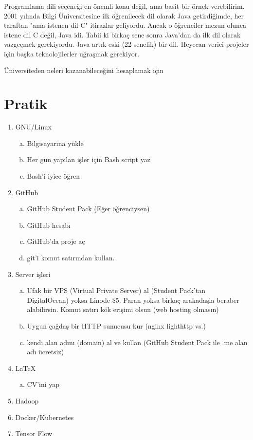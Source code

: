 \documentclass[a4paper,10pt]{article}
\begin{document}
Programlama dili seçeneği en önemli konu değil, ama basit bir örnek verebilirim. 2001 yılında Bilgi Üniversitesine ilk öğrenilecek dil olarak Java getirdiğimde, her taraftan "ama istenen dil C" itirazlar geliyordu. Ancak o öğrenciler mezun olunca istene dil C değil, Java idi. Tabii ki birkaç sene sonra Java'dan da ilk dil olarak vazgeçmek gerekiyordu. Java artık eski (22 senelik) bir dil. Heyecan verici projeler için başka teknolojilerler uğraşmak gerekiyor.

Üniversiteden neleri kazanabileceğini hesaplamak için       

\section*{Pratik}
\begin{enumerate}
  \item GNU/Linux
    \begin{enumerate}[(a)]
      \item Bilgisayarına yükle 
      \item Her gün yapılan işler için Bash script yaz
      \item Bash'i iyice öğren
    \end{enumerate}
  \item GitHub
    \begin{enumerate}[(a)]
      \item GitHub Student Pack (Eğer öğrenciysen)
      \item GitHub hesabı
      \item GitHub'da proje aç
      \item git'i komut satırından kullan.
    \end{enumerate}
  \item Server işleri
    \begin{enumerate}[(a)]
      \item Ufak bir VPS (Virtual Private Server) al (Student Pack'tan DigitalOcean) yoksa Linode \$5. Paran yoksa birkaç arakadaşla beraber alabilirsin. Komut satırı kök erişimi olsun (web hosting olmasın)
      \item Uygun çağdaş bir HTTP sunucusu kur (nginx lighthttp vs.)
      \item kendi alan adını (domain) al ve kullan (GitHub Student Pack ile .me alan adı ücretsiz)
    \end{enumerate}
  \item \LaTeX 
    \begin{enumerate}[(a)]
      \item CV'ini yap
    \end{enumerate}
   \item Hadoop
   \item Docker/Kubernetes
   \item Tensor Flow
    
\end{enumerate}
\end{document}

